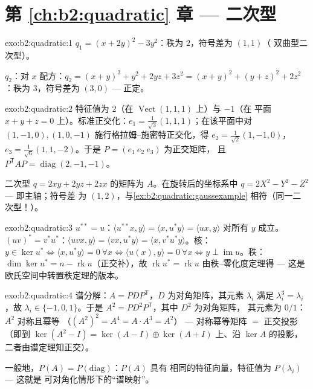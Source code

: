 \section*{第 \ref{ch:b2:quadratic} 章 --- 二次型}

\begin{solution}{exo:b2:quadratic:1}
$q_1 = (x + 2y)^2 - 3y^2$：秩为 $2$，符号差为 $(1, 1)$（
双曲型二次型）。

$q_2$：对 $x$ 配方：$q_2 = (x + y)^2 + y^2 + 2yz +
3z^2 = (x+y)^2 + (y + z)^2 + 2z^2$：秩为 $3$，符号差为 $(3, 0)$
--- 正定。
\end{solution}

\begin{solution}{exo:b2:quadratic:2}
特征值为 $2$（在 $\operatorname{Vect}(1,1,1)$ 上）与 $-1$（在
平面 $x + y + z = 0$ 上）。标准正交化：$e_1 =
\frac{1}{\sqrt3}(1,1,1)$；在该平面中对 $(1,-1,0),
(1,0,-1)$ 施行格拉姆–施密特正交化，得 $e_2 = \frac{1}{\sqrt2}(1,-1,0)$，$e_3 =
\frac{1}{\sqrt6}(1,1,-2)$。于是 $P = (e_1\ e_2\ e_3)$ 为正交矩阵，
且 $P^{\mathsf T}AP = \operatorname{diag}(2,-1,-1)$。

二次型 $q = 2xy + 2yz + 2zx$ 的矩阵为 $A$。在旋转后的坐标系中
$q = 2X^2 - Y^2 - Z^2$ --- 即主轴；符号差
为 $(1,2)$，与\cref{ex:b2:quadratic:gaussexample}
相符（同一二次型！）。
\end{solution}

\begin{solution}{exo:b2:quadratic:3}
$u^{**} = u$：$\langle u^{**}x, y\rangle = \langle x, u^*y\rangle =
\langle ux, y\rangle$ 对所有 $y$ 成立。$(uv)^* = v^*u^*$：$\langle
uvx, y\rangle = \langle vx, u^*y\rangle = \langle x,
v^*u^*y\rangle$。核：$y \in \ker u^* \iff \langle x, u^*y
\rangle = 0\ \forall x \iff \langle u(x), y\rangle = 0\ \forall x
\iff y \perp \operatorname{im} u$。秩：$\dim\ker u^* = n -
\operatorname{rk} u$（正交补），故
$\operatorname{rk} u^* = \operatorname{rk} u$ 由秩–零化度定理得 ---
这是欧氏空间中转置秩定理的版本。
\end{solution}

\begin{solution}{exo:b2:quadratic:4}
谱分解：$A = PDP^{\mathsf T}$，$D$ 为对角矩阵，其元素
$\lambda_i$ 满足 $\lambda_i^3 = \lambda_i$，故 $\lambda_i \in
\{-1, 0, 1\}$。于是 $A^2 = PD^2P^{\mathsf T}$，其中 $D^2$ 为对角矩阵，
其元素为 $0/1$：$A^2$ 对称且幂等
（$(A^2)^2 = A^4 = A\cdot A^3 = A^2$） --- 对称幂等矩阵
$=$ 正交投影（即到
$\ker(A^2 - I) = \ker(A-I)\oplus\ker(A+I)$ 上、沿 $\ker A$ 的投影，
二者由谱定理知正交）。

一般地，$P(A) = P\!\left(\text{diag}\right)$：$P(A)$ 具有
相同的特征向量，特征值为 $P(\lambda_i)$ --- 这就是
可对角化情形下的“谱映射”。
\end{solution}

